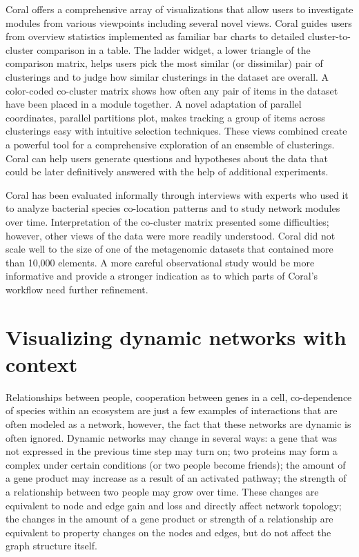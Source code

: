 \documentclass[12pt]{cmuthesis}
\newcommand\Coral{Coral\xspace}
\begin{document}
  \Coral offers a comprehensive array of visualizations that allow users to investigate modules from various viewpoints including several novel views. \Coral guides users from overview statistics implemented as familiar bar charts to detailed cluster-to-cluster comparison in a table. The ladder widget, a lower triangle of the comparison matrix, helps users pick the most similar (or dissimilar) pair of clusterings and to judge how similar clusterings in the dataset are overall. A color-coded co-cluster matrix shows how often any pair of items in the dataset have been placed in a module together. A novel adaptation of parallel coordinates, parallel partitions plot, makes tracking a group of items across clusterings easy with intuitive selection techniques. These views combined create a powerful tool for a comprehensive exploration of an ensemble of clusterings. \Coral can help users generate questions and hypotheses about the data that could be later definitively answered with the help of additional experiments.

  \Coral has been evaluated informally through interviews with experts who used it to analyze bacterial species co-location patterns and to study network modules over time. Interpretation of the co-cluster matrix presented some difficulties; however, other views of the data were more readily understood. Coral did not scale well to the size of one of the metagenomic datasets that contained more than 10,000 elements. A more careful observational study would be more informative and provide a stronger indication as to which parts of Coral's workflow need further refinement.


\chapter{Visualizing dynamic networks with context}
\label{chapter:mapofjazz}

Relationships between people, cooperation between genes in a cell, co-dependence of species within an ecosystem are just a few examples of interactions that are often modeled as a network, however, the fact that these networks are dynamic is often ignored. Dynamic networks may change in several ways: a gene that was not expressed in the previous time step may turn on; two proteins may form a complex under certain conditions (or two people become friends); the amount of a gene product may increase as a result of an activated pathway; the strength of a relationship between two people may grow over time. These changes are equivalent to node and edge gain and loss and directly affect network topology; the changes in the amount of a gene product or strength of a relationship are equivalent to property changes on the nodes and edges, but do not affect the graph structure itself.
\end{document}
